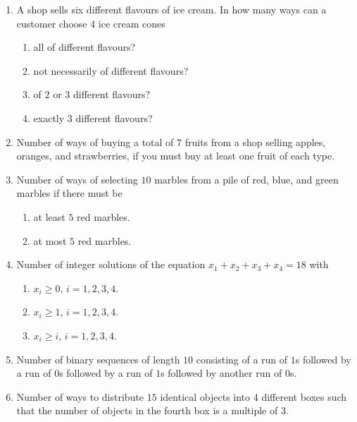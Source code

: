 \documentclass[svgnames]{amsart}
\begin{document}
\begin{enumerate}[leftmargin=*]
\item A shop sells six different flavours of ice cream. In how many ways can a customer choose $4$ ice cream cones
\begin{enumerate}[label=(\roman*)]
	\item all of different flavours?
	\item not necessarily of different flavours?
	\item of $2$ or $3$ different flavours?
	\item exactly $3$ different flavours?
\end{enumerate}

\item Number of ways of buying a total of $7$ fruits from a shop selling apples, oranges, and strawberries, if you must buy at least one fruit of each type.

\item Number of ways of selecting $10$ marbles from a pile of red, blue, and green marbles if there must be
\begin{enumerate}[label=(\roman*)]
	\item at least $5$ red marbles.
	\item at most $5$ red marbles.
\end{enumerate}

\item Number of integer solutions of the equation $x_1 + x_2 + x_3 + x_4 = 18$ with
\begin{enumerate}[label=(\roman*)]
	\item $x_i \ge 0$, $i = 1, 2, 3, 4$.
	\item $x_i \ge 1$, $i = 1, 2, 3, 4$.
	\item $x_i \ge i$, $i = 1, 2, 3, 4$.
\end{enumerate}

\item Number of binary sequences of length $10$ consisting of a run of $1$s followed by a run of $0$s followed by a run of $1$s followed by another run of $0$s.

\item Number of ways to distribute $15$ identical objects into $4$ different boxes such that the number of objects in the fourth box is a multiple of $3$.
\end{enumerate}
\end{document}
